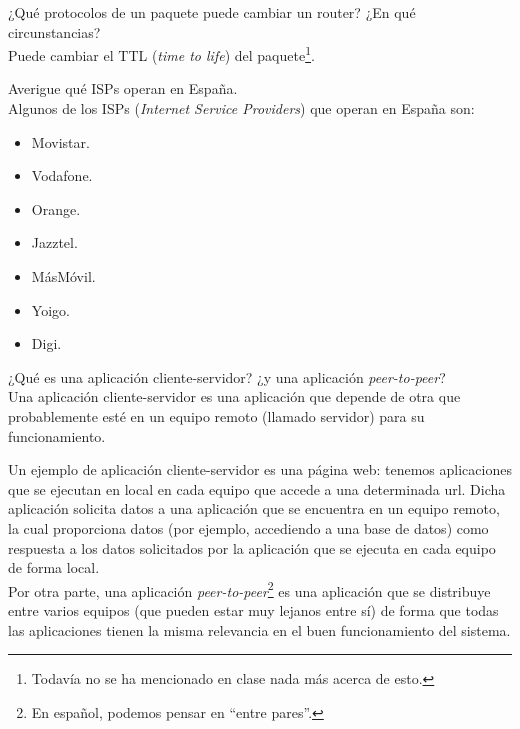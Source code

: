 \begin{ejercicio}
    ¿Qué protocolos de un paquete puede cambiar un router? ¿En qué circunstancias?\\

    Puede cambiar el TTL (\textit{time to life}) del paquete\footnote{Todavía no se ha mencionado en clase nada más acerca de esto.}.
    \begin{comment}
        Un router puede cambiar los protocolos situados debajo de la capa de red, siempre
        que sea necesario debido a que las redes que interconecta tengan dichos protocolos
        diferentes. Por ejemplo, una red doméstica típica es aquella basada en wifi (IEEE
        802.11) y con acceso a Internet contratado con tecnología ADSL. En este caso, el
        router inalámbrico deberá modificar el protocolo de las capas físicas y de enlace
        convenientemente.
    \end{comment}
\end{ejercicio}

\begin{ejercicio}
    Averigue qué ISPs operan en España.\\

    Algunos de los ISPs (\textit{Internet Service Providers}) que operan en España son:
    \begin{itemize}
        \item Movistar.
        \item Vodafone.
        \item Orange.
        \item Jazztel.
        \item MásMóvil.
        \item Yoigo.
        \item Digi.
    \end{itemize}
\end{ejercicio}

\begin{ejercicio}
    ¿Qué es una aplicación cliente-servidor? ¿y una aplicación \textit{peer-to-peer}?\\

    Una aplicación cliente-servidor es una aplicación que depende de otra que probablemente esté en un equipo remoto (llamado servidor) para su funcionamiento. 

    Un ejemplo de aplicación cliente-servidor es una página web: tenemos aplicaciones que se ejecutan en local en cada equipo que accede a una determinada url. Dicha aplicación solicita datos a una aplicación que se encuentra en un equipo remoto, la cual proporciona datos (por ejemplo, accediendo a una base de datos) como respuesta a los datos solicitados por la aplicación que se ejecuta en cada equipo de forma local.\\

    Por otra parte, una aplicación \textit{peer-to-peer}\footnote{En español, podemos pensar en ``entre pares''.} es una aplicación que se distribuye entre varios equipos (que pueden estar muy lejanos entre sí) de forma que todas las aplicaciones tienen la misma relevancia en el buen funcionamiento del sistema.
\end{ejercicio}


